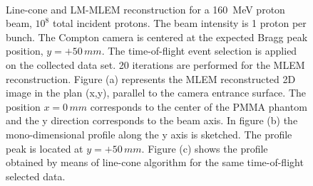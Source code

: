\begin{figure}
\centering
{}
\\
\caption{Line-cone and LM-MLEM reconstruction for a 160~MeV proton beam, $10^{8}$ total incident protons. The beam intensity is 1 proton per bunch. The Compton camera is centered at the expected Bragg peak position, $y=+50\,mm$. The time-of-flight event selection is applied on the collected data set. 20 iterations are performed for the MLEM reconstruction.
Figure (a) represents the MLEM reconstructed 2D image in the plan (x,y), parallel to the camera entrance surface. The position $x=0\,mm$ corresponds to the center of the PMMA phantom and the y direction corresponds to the beam axis.  In figure (b) the mono-dimensional profile along the y axis is sketched. The profile peak is located at $y=+50\,mm$. Figure (c) shows the profile obtained by means of line-cone algorithm for the same time-of-flight selected data.}
\label{fig:comparison}
\end{figure}


